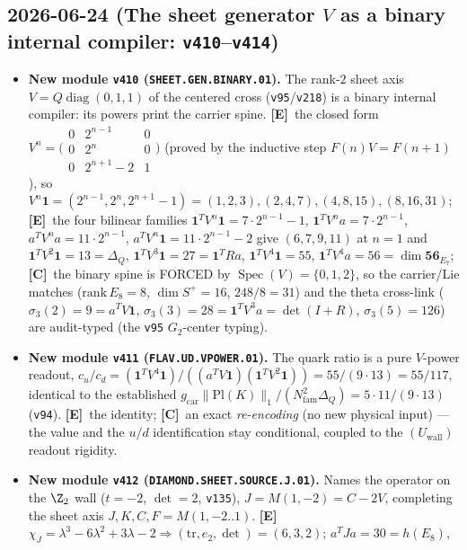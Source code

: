 \documentclass[11pt]{article}
\providecommand{\mE}{\textbf{[E]}}\providecommand{\mC}{\textbf{[C]}}
\providecommand{\vref}[1]{\texttt{#1}}
\providecommand{\gcar}{g_{\mathrm{car}}}\providecommand{\Nfam}{N_{\mathrm{fam}}}
\begin{document}
\subsection*{2026-06-24 (The sheet generator $V$ as a binary internal compiler: \texttt{v410}--\texttt{v414})}
\begin{itemize}
\item \textbf{New module \texttt{v410} (\texttt{SHEET.GEN.BINARY.01}).} The rank-$2$ sheet axis
$V=Q\operatorname{diag}(0,1,1)$ of the centered cross (\vref{v95}/\vref{v218}) is a binary internal compiler:
its powers print the carrier spine. \mE\ the closed form $V^n=\big(\begin{smallmatrix}0&2^{n-1}&0\\0&2^n&0\\0&2^{n+1}-2&1\end{smallmatrix}\big)$
(proved by the inductive step $F(n)V{=}F(n{+}1)$), so $V^n\mathbf 1=(2^{n-1},2^n,2^{n+1}-1)=(1,2,3),(2,4,7),(4,8,15),(8,16,31)$;
\mE\ the four bilinear families $\mathbf 1^TV^n\mathbf 1=7\cdot2^{n-1}{-}1$, $\mathbf 1^TV^na=7\cdot2^{n-1}$,
$a^TV^na=11\cdot2^{n-1}$, $a^TV^n\mathbf 1=11\cdot2^{n-1}{-}2$ give $(6,7,9,11)$ at $n{=}1$ and
$\mathbf 1^TV^2\mathbf 1{=}13{=}\Delta_Q$, $\mathbf 1^TV^3\mathbf 1{=}27{=}\mathbf 1^TRa$,
$\mathbf 1^TV^4\mathbf 1{=}55$, $\mathbf 1^TV^4a{=}56{=}\dim\mathbf{56}_{E_7}$; \mC\ the binary spine is FORCED by
$\operatorname{Spec}(V){=}\{0,1,2\}$, so the carrier/Lie matches ($\mathrm{rank}\,E_8{=}8$, $\dim S^+{=}16$,
$248/8{=}31$) and the theta cross-link ($\sigma_3(2){=}9{=}a^TV\mathbf 1$, $\sigma_3(3){=}28{=}\mathbf 1^TV^3a{=}\det(I{+}R)$,
$\sigma_3(5){=}126$) are audit-typed (the \vref{v95} $G_2$-center typing).
\item \textbf{New module \texttt{v411} (\texttt{FLAV.UD.VPOWER.01}).} The quark ratio is a pure $V$-power readout,
$c_u/c_d=(\mathbf 1^TV^4\mathbf 1)/((a^TV\mathbf 1)(\mathbf 1^TV^2\mathbf 1))=55/(9\cdot13)=55/117$, identical to the
established $\gcar\|\mathrm{Pl}(K)\|_1/(\Nfam^2\Delta_Q)=5\cdot11/(9\cdot13)$ (\vref{v94}). \mE\ the identity; \mC\ an
exact \emph{re-encoding} (no new physical input) --- the value and the $u/d$ identification stay conditional, coupled
to the $(U_{\mathrm{wall}})$ readout rigidity.
\item \textbf{New module \texttt{v412} (\texttt{DIAMOND.SHEET.SOURCE.J.01}).} Names the operator on the $\Z_2$ wall
($t{=}{-}2$, $\det{=}2$, \vref{v135}), $J{=}M(1,{-}2){=}C{-}2V$, completing the sheet axis $J,K,C,F{=}M(1,{-}2..1)$.
\mE\ $\chi_J=\lambda^3-6\lambda^2+3\lambda-2\Rightarrow(\mathrm{tr},e_2,\det){=}(6,3,2)$; $a^TJa{=}30{=}h(E_8)$,

\end{itemize}
\end{document}
